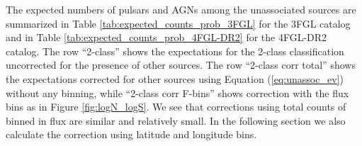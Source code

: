 The expected numbers of pulsars and AGNs among the unassociated sources
are summarized in Table \ref{tab:expected_counts_prob_3FGL} for the 3FGL catalog and 
in Table \ref{tab:expected_counts_prob_4FGL-DR2} for the 4FGL-DR2 catalog.
The row ``2-class'' shows the expectations for the 2-class classification uncorrected for the presence of other sources.
The row ``2-class corr total'' shows the expectations corrected for other sources using Equation (\ref{eq:unassoc_ev}) without any binning,
while ``2-class corr F-bins'' shows correction with the flux bins as in Figure \ref{fig:logN_logS}.
We see that corrections using total counts of binned in flux are similar and relatively small.
In the following section we also calculate the correction using latitude and longitude bins.

